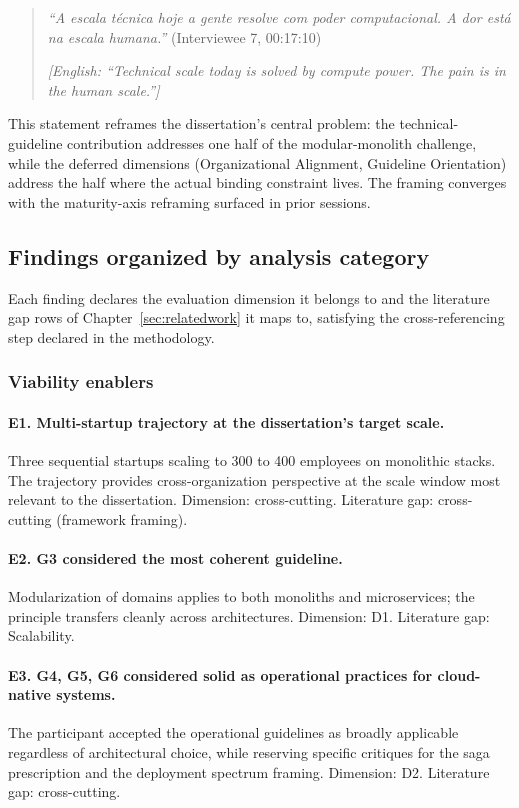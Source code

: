 \begin{quote}
\emph{``A escala técnica hoje a gente resolve com poder computacional. A dor está na escala humana.''} (Interviewee 7, 00:17:10)

\medskip

\emph{[English: ``Technical scale today is solved by compute power. The pain is in the human scale.'']}
\end{quote}

This statement reframes the dissertation's central problem: the technical-guideline contribution addresses one half of the modular-monolith challenge, while the deferred dimensions (Organizational Alignment, Guideline Orientation) address the half where the actual binding constraint lives. The framing converges with the maturity-axis reframing surfaced in prior sessions.

\subsection*{Findings organized by analysis category}

Each finding declares the evaluation dimension it belongs to and the literature gap rows of Chapter~\ref{sec:relatedwork} it maps to, satisfying the cross-referencing step declared in the methodology.

\subsubsection*{Viability enablers}

\paragraph*{E1. Multi-startup trajectory at the dissertation's target scale.} Three sequential startups scaling to 300 to 400 employees on monolithic stacks. The trajectory provides cross-organization perspective at the scale window most relevant to the dissertation. Dimension: cross-cutting. Literature gap: cross-cutting (framework framing).

\paragraph*{E2. G3 considered the most coherent guideline.} Modularization of domains applies to both monoliths and microservices; the principle transfers cleanly across architectures. Dimension: D1. Literature gap: Scalability.

\paragraph*{E3. G4, G5, G6 considered solid as operational practices for cloud-native systems.} The participant accepted the operational guidelines as broadly applicable regardless of architectural choice, while reserving specific critiques for the saga prescription and the deployment spectrum framing. Dimension: D2. Literature gap: cross-cutting.

